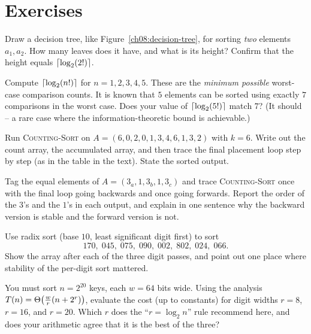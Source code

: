\section{Exercises}

\begin{exercise}
Draw a decision tree, like Figure~\ref{ch08:decision-tree}, for sorting
\emph{two} elements $a_1, a_2$. How many leaves does it have, and what is its
height? Confirm that the height equals $\lceil\log_2(2!)\rceil$.
\end{exercise}

\begin{exercise}
Compute $\lceil\log_2(n!)\rceil$ for $n = 1, 2, 3, 4, 5$. These are the
\emph{minimum possible} worst-case comparison counts. It is known that $5$
elements can be sorted using exactly $7$ comparisons in the worst case. Does
your value of $\lceil\log_2(5!)\rceil$ match $7$? (It should -- a rare case where the
information-theoretic bound is achievable.)
\end{exercise}

\begin{exercise}
Run \textsc{Counting-Sort} on $A = (6, 0, 2, 0, 1, 3, 4, 6, 1, 3, 2)$ with
$k = 6$. Write out the count array, the accumulated array, and then trace the
final placement loop step by step (as in the table in the text). State the
sorted output.
\end{exercise}

\begin{exercise}
Tag the equal elements of $A = (3_a, 1, 3_b, 1, 3_c)$ and trace
\textsc{Counting-Sort} once with the final loop going backwards and once going
forwards. Report the order of the $3$'s and the $1$'s in each output, and
explain in one sentence why the backward version is stable and the forward
version is not.
\end{exercise}

\begin{exercise}
Use radix sort (base $10$, least significant digit first) to sort
\[
170,\; 045,\; 075,\; 090,\; 002,\; 802,\; 024,\; 066.
\]
Show the array after each of the three digit passes, and point out one place
where stability of the per-digit sort mattered.
\end{exercise}

\begin{exercise}
You must sort $n = 2^{20}$ keys, each $w = 64$ bits wide. Using the analysis
$T(n) = \Theta\bigl(\tfrac{w}{r}(n + 2^r)\bigr)$, evaluate the cost (up to
constants) for digit widths $r = 8$, $r = 16$, and $r = 20$. Which $r$ does the
``$r = \log_2 n$'' rule recommend here, and does your arithmetic agree that it
is the best of the three?
\end{exercise}

